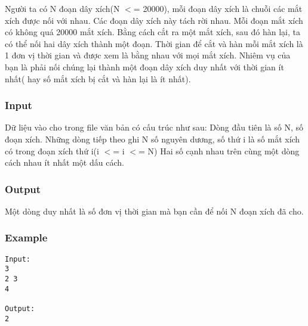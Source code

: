 



   Người ta có N đoạn dây xích(N $<$= 20000), mỗi đoạn dây xích là  chuỗi các mắt xích được nối với nhau. Các đoạn dây xích này tách rời nhau. Mỗi đoạn mắt xích có không quá 20000 mắt xích.  Bằng cách cắt ra một mắt xích, sau đó hàn lại, ta có thể nối hai dây xích thành một đoạn. Thời gian để cắt và hàn mỗi mắt xích là 1 đơn vị thời gian và được xem là bằng nhau với mọi mắt xích.  Nhiêm vụ của bạn là phải nối chúng lại thành một đoạn dây xích duy nhất với thời gian ít nhất( hay số mắt xích bị cắt và hàn lại là ít nhất).  

\subsubsection{   Input  }

   Dữ liệu vào cho trong file văn bản có cấu trúc như sau:  Dòng đầu tiên là số N, số đoạn xích.  Những dòng tiếp theo ghi N số nguyên dương, số thứ i là số mắt xích có trong đoạn xích thứ i(i $<$= i $<$= N)  Hai số cạnh nhau trên cùng một dòng cách nhau ít nhất một dấu cách.  

\subsubsection{   Output  }

   Một dòng duy nhất là số đơn vị thời gian mà bạn cần để nối N đoạn xích đã cho.  

\subsubsection{   Example  }
\begin{verbatim}
Input:
3
2 3
4

Output:
2
\end{verbatim}